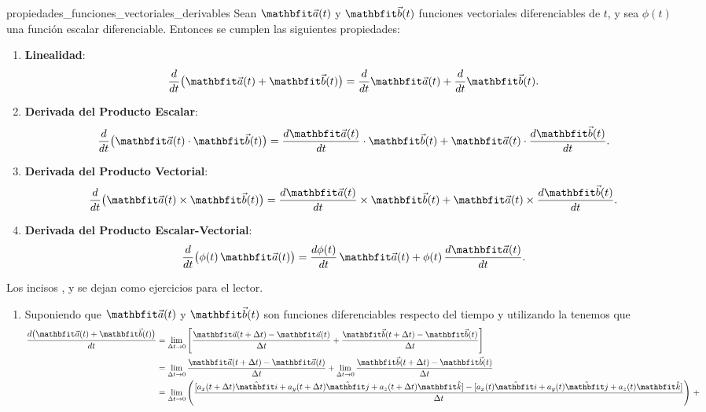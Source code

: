 \begin{theorem}{}{propiedades_funciones_vectoriales_derivables}
    Sean $\veca(t)$ y $\vecb(t)$ funciones vectoriales diferenciables de $t$, y sea $\phi(t)$ una función escalar diferenciable. Entonces se cumplen las siguientes propiedades:
    \begin{enumerate}[label=\textit{\roman*)}]
        \item \textbf{Linealidad}:
        $$\frac{d}{dt} \bigl(\veca(t) + \vecb(t)\bigr) = \frac{d}{dt}\veca(t) + \frac{d}{dt}\vecb(t).$$
        \item \textbf{Derivada del Producto Escalar}:
        $$\frac{d}{dt} \bigl(\veca(t) \cdot \vecb(t)\bigr) = \frac{d\veca(t)}{dt} \cdot \vecb(t) + \veca(t) \cdot \frac{d\vecb(t)}{dt}.$$
        \item \textbf{Derivada del Producto Vectorial}:
        $$\frac{d}{dt} \bigl(\veca(t) \times \vecb(t)\bigr) = \frac{d\veca(t)}{dt} \times \vecb(t) + \veca(t) \times \frac{d\vecb(t)}{dt}.$$
        \item \textbf{Derivada del Producto Escalar-Vectorial}:
        $$\frac{d}{dt} \bigl(\phi(t)\,\veca(t)\bigr) = \frac{d\phi(t)}{dt}\,\veca(t) + \phi(t)\,\frac{d\veca(t)}{dt}.$$
    \end{enumerate}
    \dem Los incisos ,  y  se dejan como ejercicios para el lector.
    \begin{enumerate}[label=\textit{\roman*)}]
        \item Suponiendo que $\veca(t)$ y $\vecb(t)$ son funciones diferenciables respecto del tiempo y utilizando la  tenemos que
                \begin{align*}
                    \frac{d \bigl(\veca(t) + \vecb(t)\bigr)}{dt} & = \lim_{\Deltat \to 0} \left[\frac{\veca(t + \Deltat) - \veca(t)}{\Deltat} + \frac{\vecb(t + \Deltat) - \vecb(t)}{\Deltat}\right] \\
                    & = \lim_{\Deltat \to 0} \frac{\veca(t + \Deltat) - \veca(t)}{\Deltat} + \lim_{\Deltat \to 0} \frac{\vecb(t + \Deltat) - \vecb(t)}{\Deltat} \\
                    & = \lim_{\Deltat \to 0} \left(\frac{[a_x(t + \Deltat)\veci + a_y(t + \Deltat)\vecj + a_z(t + \Deltat)\veck] - [a_x(t)\veci + a_y(t)\vecj + a_z(t)\veck]}{\Deltat}\right) \, + \\

\end{align*}
\end{enumerate}
\end{theorem}
